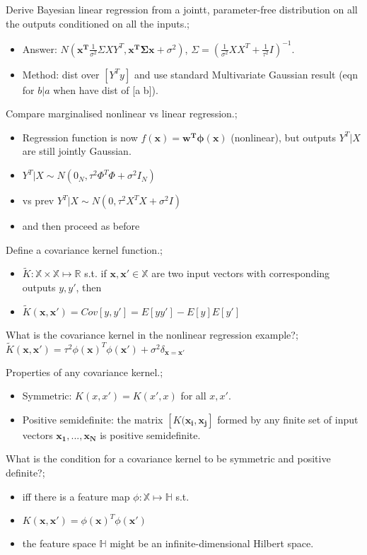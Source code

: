 \documentclass{article}
\begin{document}
Derive Bayesian linear regression from a jointt, parameter-free distribution on all the outputs conditioned on all the inputs.; \begin{itemize} \item Answer: $N(\mathbf{x^T}\frac{1}{\sigma^2}\Sigma XY^T, \mathbf{x^T\Sigma x}+\sigma^2)$, $\Sigma=(\frac{1}{\sigma^2}XX^T+\frac{1}{\tau^2}I)^{-1}$.  \item Method: dist over $[Y^T y]$ and use standard Multivariate Gaussian result (eqn for $b|a$ when have dist of [a b]).  \end{itemize} 

Compare marginalised nonlinear vs linear regression.; \begin{itemize} \item Regression function is now $f(\mathbf{x})=\mathbf{w^T\phi(x)}$ (nonlinear), but outputs $Y^T|X$ are still jointly Gaussian.  \item $Y^T|X\sim N(0_N, \tau^2\Phi^T\Phi+\sigma^2I_N)$ \item vs prev $Y^T|X\sim N(0, \tau^2X^TX+\sigma^2I)$ \item and then proceed as before \end{itemize}

Define a covariance kernel function.; \begin{itemize} \item $\tilde{K}:\mathbb{X}\times \mathbb{X}\mapsto \mathbb{R}$ s.t. if $\mathbf{x, x'} \in \mathbb{X}$ are two input vectors with corresponding outputs $y, y'$, then \item $\tilde{K}(\mathbf{x, x'})=Cov[y, y']=E[yy']-E[y]E[y']$ \end{itemize} 

What is the covariance kernel in the nonlinear regression example?; $\tilde{K}(\mathbf{x, x'})=\tau^2\phi(\mathbf{x})^T\phi(\mathbf{x}')+\sigma^2\delta_{\mathbf{x}=\mathbf{x}'}$

Properties of any covariance kernel.; \begin{itemize} \item Symmetric: $K(x, x')=K(x', x)$ for all $x, x'$.  \item Positive semidefinite: the matrix $[K(\mathbf{x_i, x_j}]$ formed by any finite set of input vectors $\mathbf{x_1, ..., x_N}$ is positive semidefinite.  \end{itemize}

What is the condition for a covariance kernel to be symmetric and positive definite?; \begin{itemize} \item iff there is a feature map $\phi:\mathbb{X}\mapsto\mathbb{H}$ s.t.  \item $K(\mathbf{x, x'})=\phi(\mathbf{x})^T\phi(\mathbf{x'})$ \item the feature space $\mathbb{H}$ might be an infinite-dimensional Hilbert space.  \end{itemize}
\end{document}
